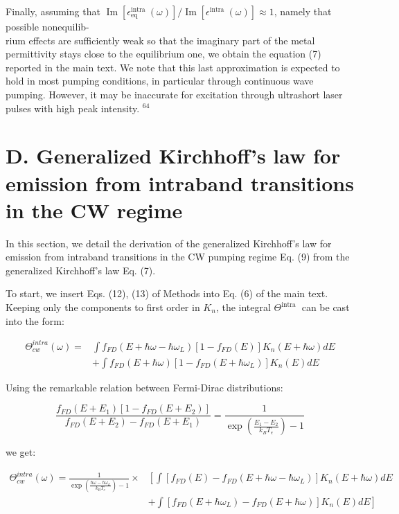 \documentclass[10pt]{article}
\begin{document}
Finally, assuming that $\operatorname{Im}\left[\epsilon_{\text {eq }}^{\text {intra }}(\omega)\right] / \operatorname{Im}\left[\epsilon^{\text {intra }}(\omega)\right] \approx 1$, namely that possible nonequilib-\\
rium effects are sufficiently weak so that the imaginary part of the metal permittivity stays close to the equilibrium one, we obtain the equation (7) reported in the main text. We note that this last approximation is expected to hold in most pumping conditions, in particular through continuous wave pumping. However, it may be inaccurate for excitation through ultrashort laser pulses with high peak intensity. ${ }^{64}$

\section*{D. Generalized Kirchhoff's law for emission from intraband transitions in the CW regime}
In this section, we detail the derivation of the generalized Kirchhoff's law for emission from intraband transitions in the CW pumping regime Eq. (9) from the generalized Kirchhoff's law Eq. (7).

To start, we insert Eqs. (12), (13) of Methods into Eq. (6) of the main text. Keeping only the components to first order in $K_{n}$, the integral $\Theta^{\text {intra }}$ can be cast into the form:


\begin{align*}
\Theta_{c w}^{i n t r a}(\omega)= & \int f_{F D}\left(E+\hbar \omega-\hbar \omega_{L}\right)\left[1-f_{F D}(E)\right] K_{n}(E+\hbar \omega) d E  \tag{S.35}\\
& +\int f_{F D}(E+\hbar \omega)\left[1-f_{F D}\left(E+\hbar \omega_{L}\right)\right] K_{n}(E) d E
\end{align*}


Using the remarkable relation between Fermi-Dirac distributions:


\begin{equation*}
\frac{f_{F D}\left(E+E_{1}\right)\left[1-f_{F D}\left(E+E_{2}\right)\right]}{f_{F D}\left(E+E_{2}\right)-f_{F D}\left(E+E_{1}\right)}=\frac{1}{\exp \left(\frac{E_{1}-E_{2}}{k_{B} T_{e}}\right)-1} \tag{S.36}
\end{equation*}


we get:


\begin{align*}
\Theta_{c w}^{i n t r a}(\omega)=\frac{1}{\exp \left(\frac{\hbar \omega-\hbar \omega_{L}}{k_{B} T_{e}}\right)-1} \times & {\left[\int\left[f_{F D}(E)-f_{F D}\left(E+\hbar \omega-\hbar \omega_{L}\right)\right] K_{n}(E+\hbar \omega) d E\right.} \\
& \left.+\int\left[f_{F D}\left(E+\hbar \omega_{L}\right)-f_{F D}(E+\hbar \omega)\right] K_{n}(E) d E\right] \tag{S.37}
\end{align*}
\end{document}

